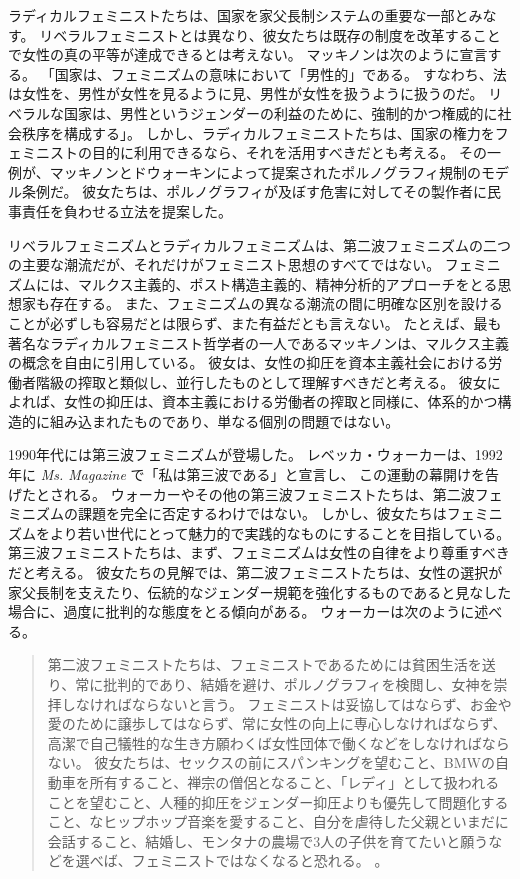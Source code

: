 \documentclass[paper=a4,book,openany]{jlreq} \usepackage{mystyle}
\begin{document}
ラディカルフェミニストたちは、国家を家父長制システムの重要な一部とみなす。
リベラルフェミニストとは異なり、彼女たちは既存の制度を改革することで女性の真の平等が達成できるとは考えない。
マッキノンは次のように宣言する。
「国家は、フェミニズムの意味において「男性的」である。
すなわち、法は女性を、男性が女性を見るように見、男性が女性を扱うように扱うのだ。
リベラルな国家は、男性というジェンダーの利益のために、強制的かつ権威的に社会秩序を構成する」\citep[pp.161--162]{mackinnon89:_towar_femin_theor_of_state}。
しかし、ラディカルフェミニストたちは、国家の権力をフェミニストの目的に利用できるなら、それを活用すべきだとも考える。
その一例が、マッキノンとドウォーキンによって提案されたポルノグラフィ規制のモデル条例だ。
彼女たちは、ポルノグラフィが及ぼす危害に対してその製作者に民事責任を負わせる立法を提案した。

リベラルフェミニズムとラディカルフェミニズムは、第二波フェミニズムの二つの主要な潮流だが、それだけがフェミニスト思想のすべてではない。
フェミニズムには、マルクス主義的、ポスト構造主義的、精神分析的アプローチをとる思想家も存在する。
また、フェミニズムの異なる潮流の間に明確な区別を設けることが必ずしも容易だとは限らず、また有益だとも言えない。
たとえば、最も著名なラディカルフェミニスト哲学者の一人であるマッキノンは、マルクス主義の概念を自由に引用している。
彼女は、女性の抑圧を資本主義社会における労働者階級の搾取と類似し、並行したものとして理解すべきだと考える。
彼女によれば、女性の抑圧は、資本主義における労働者の搾取と同様に、体系的かつ構造的に組み込まれたものであり、単なる個別の問題ではない\citep[p.515]{mackinnon82:_femin_marx_meth_stat}。

1990年代には第三波フェミニズムが登場した\citep[cf.][]{snyder08:_what_is_thir_wave_femin}。
レベッカ・ウォーカーは、1992年に \emph{Ms. Magazine} で「私は第三波である」と宣言し\citep{walker92:_becom_thir_wave}、
この運動の幕開けを告げたとされる。
ウォーカーやその他の第三波フェミニストたちは、第二波フェミニズムの課題を完全に否定するわけではない。
しかし、彼女たちはフェミニズムをより若い世代にとって魅力的で実践的なものにすることを目指している。
第三波フェミニストたちは、まず、フェミニズムは女性の自律をより尊重すべきだと考える。
彼女たちの見解では、第二波フェミニストたちは、女性の選択が家父長制を支えたり、伝統的なジェンダー規範を強化するものであると見なした場合に、過度に批判的な態度をとる傾向がある\citep[p.xxii]{hernández02:_colon_this}。
ウォーカーは次のように述べる。

\begin{quote}
  第二波フェミニストたちは、フェミニストであるためには貧困生活を送り、常に批判的であり、結婚を避け、ポルノグラフィを検閲し、女神を崇拝しなければならないと言う。
フェミニストは妥協してはならず、お金や愛のために譲歩してはならず、常に女性の向上に専心しなければならず、高潔で自己犠牲的な生き方{\DDASH}願わくば女性団体で働くなど{\DDASH}をしなければならない。
彼女たちは、セックスの前にスパンキングを望むこと、BMWの自動車を所有すること、禅宗の僧侶となること、「レディ」として扱われることを望むこと、人種的抑圧をジェンダー抑圧よりも優先して問題化すること、なヒップホップ音楽を愛すること、自分を虐待した父親といまだに会話すること、結婚し、モンタナの農場で3人の子供を育てたいと願うなどを選べば、フェミニストではなくなると恐れる。
\citep[p.xxxii]{walker95:_to_be_real}。
\end{quote}
\end{document}
